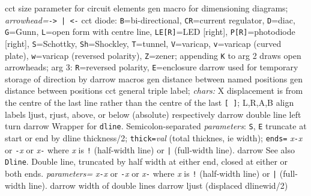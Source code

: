   {cct}
  {size parameter for circuit elements }
  {gen}
  {macro for dimensioning diagrams;
      {\sl arrowhead=}{\tt -> | <-}}
  {cct}
  {diode:
   {\tt B}=bi-directional,
   {\tt CR}=current regulator,
   {\tt D}=diac,
   {\tt G}=Gunn,
   {\tt L}=open form with centre line,
   {\tt LE[R]}=LED [right],
   {\tt P[R]}=photodiode [right],
   {\tt S}=Schottky,
   {\tt Sh}=Shockley,
   {\tt T}=tunnel,
   {\tt V}=varicap,
   {\tt v}=varicap (curved plate),
   {\tt w}=varicap (reversed polarity),
   {\tt Z}=zener;
   appending {\tt K} to arg 2 draws open arrowheads;
   arg 3: {\tt R}=reversed polarity, {\tt E}=enclosure }
  {darrow}
  {used for temporary storage of direction by darrow macros}
  {gen}
  {distance between named positions}
  {gen}
  {distance between positions}
  {cct}
  {general triple label; {\sl chars:}
    X displacement is from the centre of the last
      line rather than the centre of the last {\tt [ ]};
    L,R,A,B align labels ljust, rjust, above,
      or below (absolute) respectively  }
  {darrow}
  {double line left turn}
  {darrow}
  {Wrapper for {\tt dline}.
  Semicolon-separated {\sl parameters}:
    {\tt S}, {\tt E} truncate at start or end by dline thickness/2;
    {\tt thick=}{\sl val}   (total thicknes, ie width);
    {\tt ends=}
      {\sl x}{\tt -}{\sl x} or
      {\tt -}{\sl x} or
      {\sl x}{\tt -} where {\sl x} is {\tt !} (half-width line)
       or {\tt |} (full-width line).}
  {darrow}
  {See also {\tt Dline}.
   Double line, truncated by half width at either end, closed
    at either or both ends.
   {\sl parameters=}
      {\sl x}{\tt -}{\sl x} or
      {\tt -}{\sl x} or
      {\sl x}{\tt -} where {\sl x} is {\tt !} (half-width line)
       or {\tt |} (full-width line).}
  {darrow}
  {width of double lines}
  {darrow}
  {ljust (displaced dlinewid/2)}

